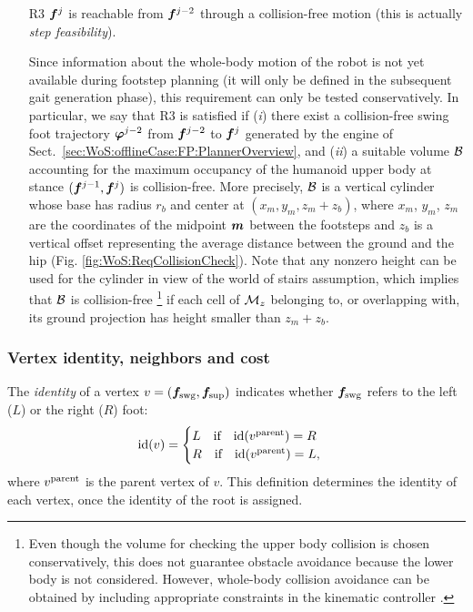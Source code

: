 \begin{itemize}
\smallskip
\item[R3] ${\bm{f}}^j$ is reachable from ${\bm{f}}^{j-2}$ through a collision-free motion (this is actually {\em step feasibility}).

\smallskip
Since information about the whole-body motion of the robot is not yet available during footstep planning (it will only be defined in the subsequent gait generation phase), this requirement can only be tested conservatively. In particular, we say that R3 is satisfied if ({\em i}) there exist a collision-free swing foot trajectory ${\bm{\varphi}}^{j-2}$ from ${\bm{f}}^{j-2}$ to ${\bm{f}}^{j}$ generated by the engine of Sect.~\ref{sec:WoS:offlineCase:FP:PlannerOverview}, and ({\em ii}) a suitable volume ${\cal B}$ accounting for the maximum occupancy of the humanoid upper body at stance $({\bm{f}}^{j-1}, {\bm{f}}^{j})$ is collision-free. More precisely, ${\cal B}$ is a vertical cylinder whose base has radius $r_b$ and center at $(x_m, y_m, z_m + z_b)$, where $x_m$, $y_m$, $z_m$ are the coordinates of the midpoint ${\bm{m}}$ between the footsteps and $z_b$ is a vertical offset representing the average distance between the ground and the hip (Fig. \ref{fig:WoS:ReqCollisionCheck}). 
Note that any nonzero height can be used for the cylinder in view of the world of stairs assumption, which implies that ${\cal B}$ is collision-free \footnote{Even though the volume for checking the upper body collision is chosen conservatively, this does not guarantee obstacle avoidance because the lower body is not considered. However, whole-body collision avoidance can be obtained by including appropriate constraints in the kinematic controller \cite{Escande_SoT2014}.} if each cell of ${\cal M}_z$ belonging to, or overlapping with, its ground projection has height smaller than $z_m + z_b$.

\end{itemize}

\medskip

\subsubsection{Vertex identity, neighbors and cost}
\label{sec:WoS:offlineCase:FP:CostFunctions}
The {\em identity} of a vertex $v=({\bm{f}}_{\rm swg}, {\bm{f}}_{\rm sup})$ indicates whether  ${\bm{f}}_{\rm swg}$ refers to the left ($L$) or the right ($R$) foot:
\[
{\rm id}(v)=
\begin{cases}
L\quad \mbox{if} \quad{\rm id}(v^{\rm parent}) = R \\
R\quad \mbox{if} \quad{\rm id}(v^{\rm parent}) = L,
\end{cases}
\]
where $v^{\rm parent}$ is the parent vertex of $v$.
This definition determines the identity of each vertex, once the identity of the root is assigned.

